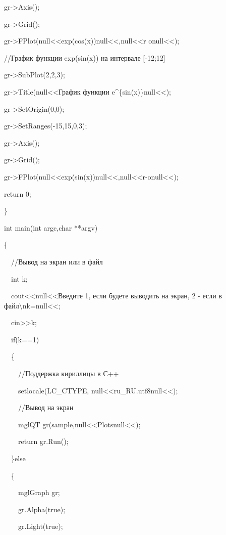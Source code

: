 {\upshape
gr-{\textgreater}Axis(); }

{\upshape
gr-{\textgreater}Grid(); }

{\upshape
gr-{\textgreater}FPlot(null{<<}exp(cos(x))null{<<},null{<<}r onull{<<});}

{\upshape
//График функции exp(sin(x)) на интервале [-12;12]}

{\upshape
gr-{\textgreater}SubPlot(2,2,3); }

{\upshape
gr-{\textgreater}Title(null{<<}График функции e\^{}\{sin(x)\}null{<<});}

{\upshape
gr-{\textgreater}SetOrigin(0,0);}

{\upshape
gr-{\textgreater}SetRanges(-15,15,0,3);}

{\upshape
gr-{\textgreater}Axis(); }

{\upshape
gr-{\textgreater}Grid(); }

{\upshape
gr-{\textgreater}FPlot(null{<<}exp(sin(x))null{<<},null{<<}r-onull{<<});}

{\upshape
return 0;}

{\upshape
\}}

{\upshape
int main(int argc,char **argv)}

{\upshape
\{}

{\upshape
\ \ //Вывод на экран или в файл}

{\upshape
\ \ int k;}

{\upshape
\ \ cout{\textless}{\textless}null{<<}Введите 1, если будете выводить на экран, 2 - если в
файл{\textbackslash}nk=null{<<};}

{\upshape
\ \ cin{\textgreater}{\textgreater}k;}

{\upshape
\ \ if(k==1)}

{\upshape
\ \ \{}

{\upshape
\ \ \ \ //Поддержка кириллицы в С++\ \ }

{\upshape
\ \ \ \ setlocale(LC\_CTYPE, null{<<}ru\_RU.utf8null{<<});}

{\upshape
\ \ \ \ //Вывод на экран}

{\upshape
\ \ \ \ mglQT gr(sample,null{<<}Plotsnull{<<});}

{\upshape
 \ \ \ \ return gr.Run();}

{\upshape
\ \ \}else}

{\upshape
\ \ \{}

{\upshape
\ \ \ \ mglGraph gr;}

{\upshape
\ \ \ \ gr.Alpha(true);}

{\upshape
\ \ \ \ gr.Light(true);}

